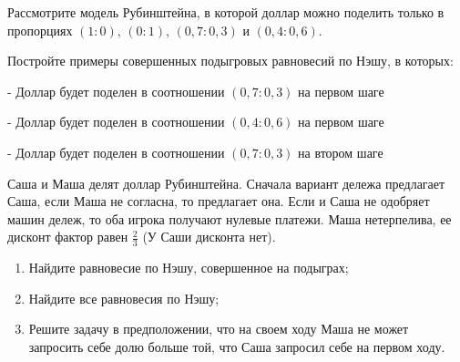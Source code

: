\begin{problem}
Рассмотрите модель Рубинштейна, в которой доллар можно поделить только в пропорциях  $\left(1:0\right)$,  $\left(0:1\right)$,  $\left(0,7:0,3\right)$  и  $\left(0,4:0,6\right)$.\par
Постройте примеры совершенных подыгровых равновесий по Нэшу, в которых:\par
- Доллар будет поделен в соотношении  $\left(0,7:0,3\right)$  на первом шаге\par
- Доллар будет поделен в соотношении  $\left(0,4:0,6\right)$  на первом шаге\par
- Доллар будет поделен в соотношении  $\left(0,7:0,3\right)$  на втором шаге\par



\begin{sol}

\end{sol}
\end{problem}



\begin{problem}
\begin{source}
 [LSE, 1998]\end{source}
Саша и Маша делят доллар Рубинштейна. Сначала вариант дележа предлагает Саша, если Маша не согласна, то предлагает она. Если и Саша не одобряет машин дележ, то оба игрока получают нулевые платежи. Маша нетерпелива, ее дисконт фактор равен  $\frac{2}{3} $ (У Саши дисконта нет).\par
\begin{enumerate}
\item  Найдите равновесие по Нэшу, совершенное на подыграх;\par
\item Найдите все равновесия по Нэшу;\par
\item  Решите задачу в предположении, что на своем ходу Маша не может запросить себе долю больше той, что Саша запросил себе на первом ходу.
\end{enumerate}


\begin{sol}

\end{sol}
\end{problem}



